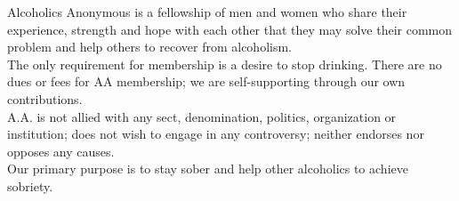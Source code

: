\documentclass[11pt,twoside,letterpaper]{article}
\def\6pt{\fontsize{6}{7.2}\selectfont}
\def\8pt{\fontsize{8.5}{10}\selectfont}
\begin{document}
{\begin{minipage}[r][\dimexpr 0.485\textheight][t]{\dimexpr 0.485\textwidth}
\begin{minipage}[r][\dimexpr 0.485\textheight][t]{\dimexpr 0.485\textwidth}
      {\8pt
      Alcoholics Anonymous is a fellowship of men and women who share their experience, strength and hope with each other that they may solve their common problem and help
      others to recover from alcoholism.\\

      The only requirement for membership is a desire to stop drinking. There are no dues or fees for AA membership; we are self-supporting through our own contributions.\\

      A.A. is not allied with any sect, denomination, politics, organization or institution; does not wish to engage in any controversy; neither endorses nor opposes any causes.\\

      Our primary purpose is to stay sober and help other alcoholics to achieve sobriety.\\

      \6pt{\copyright The A.A. Grapevine, Inc.}

      }
    \end{minipage}
  \end{minipage}
  }\vfill
\end{document}
